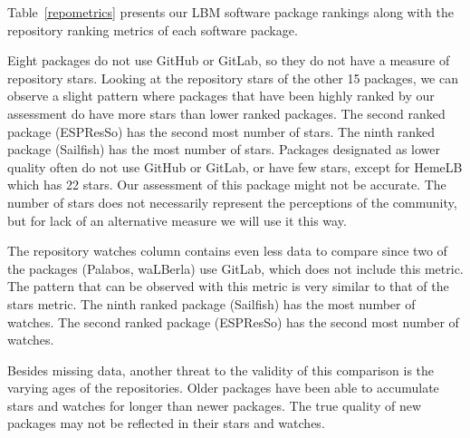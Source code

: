 \documentclass[final, 3p, times, authoryear]{elsarticle}
\begin{document}
Table~\ref{repometrics} presents our LBM software package rankings along with
the repository ranking metrics of each software package. 

Eight packages do not use GitHub or GitLab, so they do not have a measure of
repository stars. Looking at the repository stars of the other 15 packages, we
can observe a slight pattern where packages that have been highly ranked by our
assessment do have more stars than lower ranked packages. The second ranked
package (ESPResSo) has the second most number of stars. The ninth ranked package
(Sailfish) has the most number of stars. Packages designated as lower quality
often do not use GitHub or GitLab, or have few stars, except for HemeLB which
has 22 stars. Our assessment of this package might not be accurate. The number
of stars does not necessarily represent the perceptions of the community, but
for lack of an alternative measure we will use it this way. 

The repository watches column contains even less data to compare since two of
the packages (Palabos, waLBerla) use GitLab, which does not include this metric.
The pattern that can be observed with this metric is very similar to that of the
stars metric. The ninth ranked package (Sailfish) has the most number of
watches. The second ranked package (ESPResSo) has the second most number of
watches.

Besides missing data, another threat to the validity of this comparison is the
varying ages of the repositories. Older packages have been able to accumulate
stars and watches for longer than newer packages. The true quality of new
packages may not be reflected in their stars and watches. \\
\end{document}
